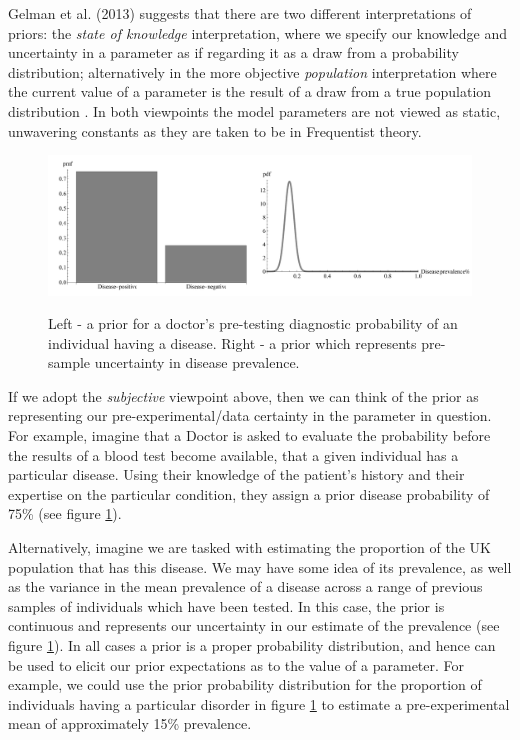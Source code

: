 \documentclass[11pt,fullpage]{book}
\begin{document}
Gelman et al. (2013) suggests that there are two different interpretations of priors: the \textit{state of knowledge} interpretation, where we specify our knowledge and uncertainty in a parameter as if regarding it as a draw from a probability distribution; alternatively in the more objective \textit{population} interpretation where the current value of a parameter is the result of a draw from a true population distribution \cite{gelman2013bayesian}. In both viewpoints the model parameters are not viewed as static, unwavering constants as they are taken to be in Frequentist theory.

\begin{figure}
\centering
\scalebox{0.3} 
{\includegraphics{Prior_introduction.pdf}}
\caption{Left - a prior for a doctor's pre-testing diagnostic probability of an individual having a disease. Right - a prior which represents pre-sample uncertainty in disease prevalence.}\label{fig:Prior_introduction}
\end{figure}

If we adopt the \textit{subjective} viewpoint above, then we can think of the prior as representing our pre-experimental/data certainty in the parameter in question. For example, imagine that a Doctor is asked to evaluate the probability before the results of a blood test become available, that a given individual has a particular disease. Using their knowledge of the patient's history and their expertise on the particular condition, they assign a prior disease probability of 75\% (see figure \ref{fig:Prior_introduction}). 

Alternatively, imagine we are tasked with estimating the proportion of the UK population that has this disease. We may have some idea of its prevalence, as well as the variance in the mean prevalence of a disease across a range of previous samples of individuals which have been tested. In this case, the prior is continuous and represents our uncertainty in our estimate of the prevalence (see figure \ref{fig:Prior_introduction}). In all cases a prior is a proper probability distribution, and hence can be used to elicit our prior expectations as to the value of a parameter. For example, we could use the prior probability distribution for the proportion of individuals having a particular disorder in figure \ref{fig:Prior_introduction} to estimate a pre-experimental mean of approximately 15\% prevalence.
\end{document}
